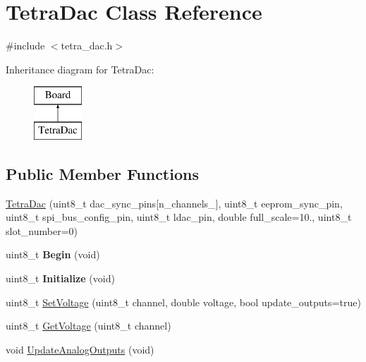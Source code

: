 \hypertarget{classTetraDac}{}\section{Tetra\+Dac Class Reference}
\label{classTetraDac}


{\ttfamily \#include $<$tetra\+\_\+dac.\+h$>$}

Inheritance diagram for Tetra\+Dac\+:\begin{figure}[H]
\begin{center}
\leavevmode
\includegraphics[height=2.000000cm]{classTetraDac}
\end{center}
\end{figure}
\subsection*{Public Member Functions}
\begin{DoxyCompactItemize}
\item 
\mbox{\hyperlink{classTetraDac_a879c8577d77c603d32a94f90114b85ef}{Tetra\+Dac}} (uint8\+\_\+t dac\+\_\+sync\+\_\+pins\mbox{[}n\+\_\+channels\+\_\+\mbox{]}, uint8\+\_\+t eeprom\+\_\+sync\+\_\+pin, uint8\+\_\+t spi\+\_\+bus\+\_\+config\+\_\+pin, uint8\+\_\+t ldac\+\_\+pin, double full\+\_\+scale=10., uint8\+\_\+t slot\+\_\+number=0)
\item 
\mbox{\label{classTetraDac_aeee47156d6a403ccbb8183b02cca798d}} 
uint8\+\_\+t {\bfseries Begin} (void)
\item 
\mbox{\label{classTetraDac_a57fd4d8db59603efe74c0c3902c64ae9}} 
uint8\+\_\+t {\bfseries Initialize} (void)
\item 
uint8\+\_\+t \mbox{\hyperlink{classTetraDac_a265bed4317bb6b3b4c6962fa538631da}{Set\+Voltage}} (uint8\+\_\+t channel, double voltage, bool update\+\_\+outputs=true)
\item 
uint8\+\_\+t \mbox{\hyperlink{classTetraDac_a6a5206bc2e525ea820a1b3279526850c}{Get\+Voltage}} (uint8\+\_\+t channel)
\item 
void \mbox{\hyperlink{classTetraDac_ae7e2c1afbc64a8cc0ddd2ef4af0b25b3}{Update\+Analog\+Outputs}} (void)
\end{DoxyCompactItemize}


